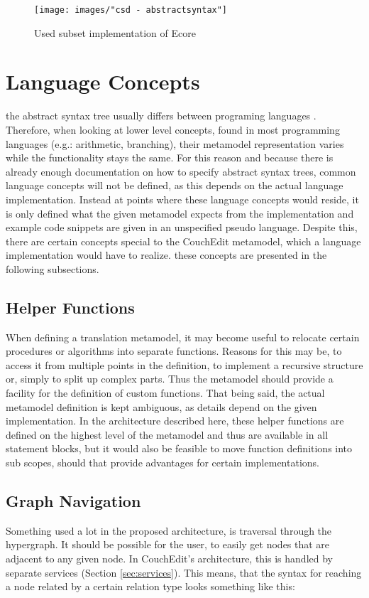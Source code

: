 \begin{figure}
  \centering
  \texttt{[image: images/"csd - abstractsyntax"]}
  \caption{Used subset implementation of Ecore}
  \label{fig:csd-abstractsyntax}
\end{figure}


\section{Language Concepts}
\label{sec:language-concepts}
the abstract syntax tree usually differs between programing languages . Therefore, when looking at lower level concepts, found in most programming languages (e.g.: arithmetic, branching), their metamodel representation varies while the functionality stays the same. For this reason and because there is already enough documentation on how to specify abstract syntax trees, common language concepts will not be defined, as this depends on the actual language implementation. Instead at points where these language concepts would reside, it is only defined what the given metamodel expects from the implementation and example code snippets are given in an unspecified pseudo language. Despite this, there are certain concepts special to the CouchEdit metamodel, which a language implementation would have to realize. these concepts are presented in the following subsections.


\subsection{Helper Functions}
When defining a translation metamodel, it may become useful to relocate certain procedures or algorithms into separate functions. Reasons for this may be, to access it from multiple points in the definition, to implement a recursive structure or, simply to split up complex parts. Thus the metamodel should provide a facility for the definition of custom functions. That being said, the actual metamodel definition is kept ambiguous, as details depend on the given implementation. In the architecture described here, these helper functions are defined on the highest level of the metamodel and thus are available in all statement blocks, but it would also be feasible to move function definitions into sub scopes, should that provide advantages for certain implementations.

\subsection{Graph Navigation}
\label{sec:abstraction}
Something used a lot in the proposed architecture, is traversal through the hypergraph. It should be possible for the user, to easily get nodes that are adjacent to any given node. In CouchEdit's architecture, this is handled by separate services (Section \ref{sec:services}). This means, that the syntax for reaching a node related by a certain relation type looks something like this:

